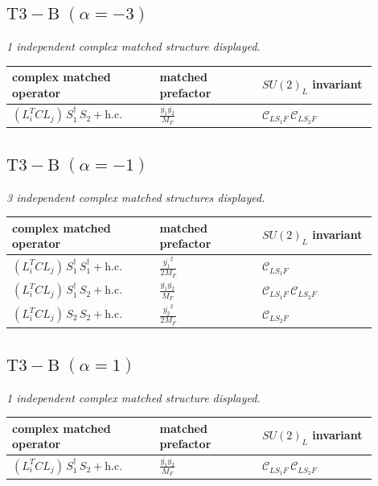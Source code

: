 \documentclass[9pt]{article}
\begin{document}
\subsection*{$ \mathrm{T3-B}\;(\alpha=-3) $}
\textit{1 independent complex matched structure displayed. }
\begin{longtable}{@{}p{0.36\linewidth}p{0.25\linewidth}p{0.29\linewidth}@{}}
\toprule
complex matched operator & matched prefactor & $SU(2)_L$ invariant \\
\midrule
$ (L_i^T C L_j)\,S_1^\dagger\,S_2+\mathrm{h.c.} $ & $ \frac{\overline{y_{1}} \overline{y_{2}}}{M_F} $ & $ \mathcal{C}_{LS_1F}\,\mathcal{C}_{LS_2F} $ \\
\bottomrule
\end{longtable}
\subsection*{$ \mathrm{T3-B}\;(\alpha=-1) $}
\textit{3 independent complex matched structures displayed. }
\begin{longtable}{@{}p{0.36\linewidth}p{0.25\linewidth}p{0.29\linewidth}@{}}
\toprule
complex matched operator & matched prefactor & $SU(2)_L$ invariant \\
\midrule
$ (L_i^T C L_j)\,S_1^\dagger\,S_1^\dagger+\mathrm{h.c.} $ & $ \frac{\overline{y_{1}}^{2}}{2 M_F} $ & $ \mathcal{C}_{LS_1F} $ \\
$ (L_i^T C L_j)\,S_1^\dagger\,S_2+\mathrm{h.c.} $ & $ \frac{\overline{y_{1}} \overline{y_{2}}}{M_F} $ & $ \mathcal{C}_{LS_1F}\,\mathcal{C}_{LS_2F} $ \\
$ (L_i^T C L_j)\,S_2\,S_2+\mathrm{h.c.} $ & $ \frac{\overline{y_{2}}^{2}}{2 M_F} $ & $ \mathcal{C}_{LS_2F} $ \\
\bottomrule
\end{longtable}
\subsection*{$ \mathrm{T3-B}\;(\alpha=1) $}
\textit{1 independent complex matched structure displayed. }
\begin{longtable}{@{}p{0.36\linewidth}p{0.25\linewidth}p{0.29\linewidth}@{}}
\toprule
complex matched operator & matched prefactor & $SU(2)_L$ invariant \\
\midrule
$ (L_i^T C L_j)\,S_1^\dagger\,S_2+\mathrm{h.c.} $ & $ \frac{\overline{y_{1}} \overline{y_{2}}}{M_F} $ & $ \mathcal{C}_{LS_1F}\,\mathcal{C}_{LS_2F} $ \\
\bottomrule
\end{longtable}
\end{document}
